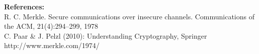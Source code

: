 \documentclass[final]{beamer}
\begin{document}
\begin{frame}[fragile]
\begin{columns}[t]
\begin{rightcolumn}
\begin{footnotesize}
   \vspace{0.3cm}
   \begin{minipage}[t]{0.75\textwidth}
      \textbf{References:} \\
      R. C. Merkle. Secure communications over insecure channels. Communications of the ACM, 21(4):294–299, 1978 \\
      C. Paar \& J. Pelzl (2010): Understanding Cryptography, Springer \\
      http://www.merkle.com/1974/

      \vspace{1cm}
   
   \end{minipage}
   \hfill
  
   \end{footnotesize}
\end{rightcolumn}

\end{columns}
\end{frame}
\end{document}
